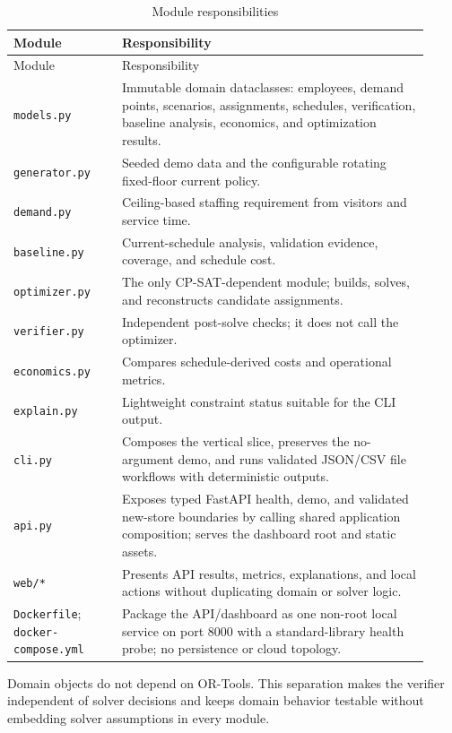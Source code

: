 \documentclass[11pt,a4paper]{article}
\begin{document}
\begin{longtable}{p{0.24\linewidth}p{0.68\linewidth}}
\caption{Module responsibilities}\label{tab:modules}\\
\toprule
Module & Responsibility\\
\midrule
\endfirsthead
\toprule
Module & Responsibility\\
\midrule
\endhead
\texttt{models.py} & Immutable domain dataclasses: employees, demand points, scenarios, assignments, schedules, verification, baseline analysis, economics, and optimization results.\\
\texttt{generator.py} & Seeded demo data and the configurable rotating fixed-floor current policy.\\
\texttt{demand.py} & Ceiling-based staffing requirement from visitors and service time.\\
\texttt{baseline.py} & Current-schedule analysis, validation evidence, coverage, and schedule cost.\\
\texttt{optimizer.py} & The only CP-SAT-dependent module; builds, solves, and reconstructs candidate assignments.\\
\texttt{verifier.py} & Independent post-solve checks; it does not call the optimizer.\\
\texttt{economics.py} & Compares schedule-derived costs and operational metrics.\\
\texttt{explain.py} & Lightweight constraint status suitable for the CLI output.\\
\texttt{cli.py} & Composes the vertical slice, preserves the no-argument demo, and runs validated JSON/CSV file workflows with deterministic outputs.\\
\texttt{api.py} & Exposes typed FastAPI health, demo, and validated new-store boundaries by calling shared application composition; serves the dashboard root and static assets.\\
\texttt{web/*} & Presents API results, metrics, explanations, and local actions without duplicating domain or solver logic.\\
\texttt{Dockerfile}; \texttt{docker-compose.yml} & Package the API/dashboard as one non-root local service on port 8000 with a standard-library health probe; no persistence or cloud topology.\\
\bottomrule
\end{longtable}

Domain objects do not depend on OR-Tools. This separation makes the verifier independent of solver decisions and keeps domain behavior testable without embedding solver assumptions in every module.
\end{document}
